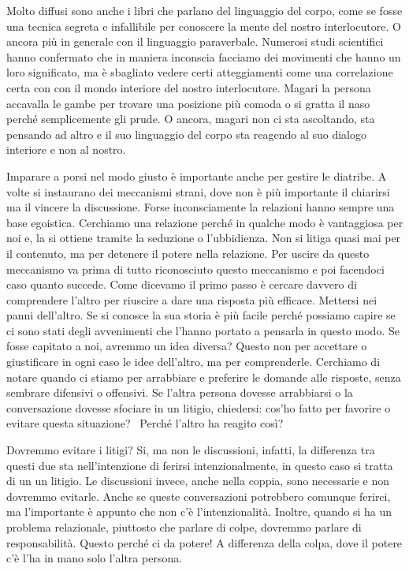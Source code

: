 \documentclass[12pt]{book} %
\begin{document}
\bigskip

Molto diffusi sono anche i libri che parlano del linguaggio del corpo, come se fosse una tecnica segreta e infallibile
per conoscere la mente del nostro interlocutore. O ancora più in generale con il linguaggio paraverbale. Numerosi studi
scientifici hanno confermato che in maniera inconscia facciamo dei movimenti che hanno un loro significato, ma è
sbagliato vedere certi atteggiamenti come una correlazione certa con con il mondo interiore del nostro interlocutore.
Magari la persona accavalla le gambe per trovare una posizione più comoda o si gratta il naso perché semplicemente gli
prude. O ancora, magari non ci sta ascoltando, sta pensando ad altro e il suo linguaggio del corpo sta reagendo al suo
dialogo interiore e non al nostro.


\bigskip

Imparare a porsi nel modo giusto è importante anche per gestire le diatribe. A volte si instaurano dei meccanismi
strani, dove non è più importante il chiarirsi ma il vincere la discussione. Forse inconsciamente la relazioni hanno
sempre una base egoistica. Cerchiamo una relazione perché in qualche modo è vantaggiosa per noi e, la si ottiene
tramite la seduzione o l'ubbidienza. Non si litiga quasi mai per il contenuto, ma per detenere il potere nella
relazione. Per uscire da questo meccanismo va prima di tutto riconosciuto questo meccanismo e poi facendoci caso quanto
succede. Come dicevamo il primo passo è cercare davvero di comprendere l'altro per riuscire a dare
una risposta più efficace. Mettersi nei panni dell'altro. Se si conosce la sua storia è più facile
perché possiamo capire se ci sono stati degli avvenimenti che l'hanno portato a pensarla in questo
modo. Se fosse capitato a noi, avremmo un idea diversa? Questo non per accettare o giustificare in ogni caso le idee
dell'altro, ma per comprenderle. Cerchiamo di notare quando ci stiamo per arrabbiare e preferire
le domande alle risposte, senza sembrare difensivi o offensivi. Se l'altra persona dovesse
arrabbiarsi o la conversazione dovesse sfociare in un litigio, chiedersi: cos'ho fatto per favorire o evitare questa
situazione? \ Perché l'altro ha reagito così? 

Dovremmo evitare i litigi? Si, ma non le discussioni, infatti, la differenza tra questi due sta
nell'intenzione di ferirsi intenzionalmente, in questo caso si tratta di un un litigio. Le
discussioni invece, anche nella coppia, sono necessarie e non dovremmo evitarle. Anche se queste conversazioni
potrebbero comunque ferirci, ma l'importante è appunto che non c'è
l'intenzionalità. Inoltre, quando si ha un problema relazionale, piuttosto che parlare di colpe,
dovremmo parlare di responsabilità. Questo perché ci da potere! A differenza della colpa, dove il potere c'è l'ha in
mano solo l'altra persona.
\end{document}
